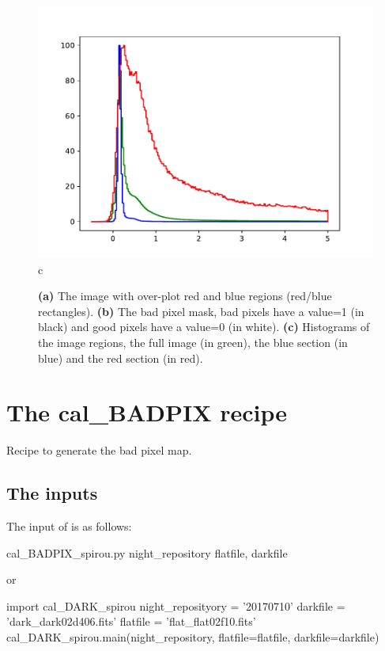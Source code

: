 \begin{figure}
\begin{center}
\begin{minipage}{.495\textwidth}
\begin{center}
\includegraphics[width=\textwidth]{Figures/cal_DARK_spirou_3.pdf}
c
\end{center}
\end{minipage}%
\end{center}

\caption{\textbf{(a)} The image with over-plot red and blue regions (red/blue rectangles). \textbf{(b)} The bad pixel mask, bad pixels have a value=1 (in black) and good pixels have a value=0 (in white). \textbf{(c)} Histograms of the image regions, the full image (in green), the blue section (in blue) and the red section (in red). \label{figure:cal_DARK_spirou}}
\end{figure}



\clearpage
\newpage
\section{The cal\_BADPIX recipe}
\label{ch:the_recipes:cal_BADPIX_spirou}

Recipe to generate the bad pixel map. \\

\subsection{The inputs}
The input of \calbadpix is as follows:
\begin{cmdbox}
cal_BADPIX_spirou.py  night_repository  flatfile, darkfile
\end{cmdbox}
\noindent or
\begin{pythonbox}
import cal_DARK_spirou
night_reposityory = '20170710'
darkfile = 'dark_dark02d406.fits'
flatfile = 'flat_flat02f10.fits'
cal_DARK_spirou.main(night_repository, flatfile=flatfile, darkfile=darkfile)
\end{pythonbox}

